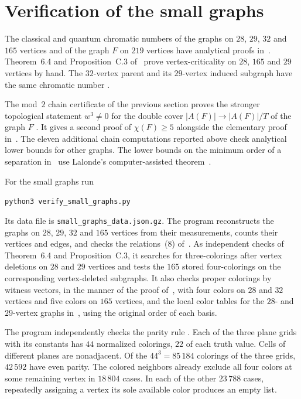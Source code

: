 \documentclass[11pt,a4paper]{article}
\begin{document}
\section{Verification of the small graphs}

The classical and quantum chromatic numbers of the graphs on $28$,
$29$, $32$ and $165$ vertices and of the graph $F$ on $219$ vertices have
analytical proofs in~\cite{Z}. Theorem~6.4 and Proposition~C.3 of~\cite{Z}
prove vertex-criticality on $28$, $165$ and $29$ vertices by hand. The
$32$-vertex parent and its $29$-vertex induced subgraph have the same
chromatic number \cite[Remark~C.4]{Z}.

The mod~$2$ chain certificate of the previous section proves the stronger
topological statement $w^3\ne0$ for the double cover
$|A(F)|\to |A(F)|/T$ of the graph $F$ \cite[Proposition~3.6]{Z}. It
gives a second proof of $\chi(F)\ge5$ alongside the elementary proof
in~\cite[Corollary~3.5]{Z}. The eleven additional chain computations
reported above check analytical lower bounds for other graphs. The lower
bounds on the minimum order of a separation in~\cite[Section~7]{Z} use
Lalonde's computer-assisted theorem~\cite{La}.

For the small graphs run
\begin{center}
  \texttt{python3 verify\_small\_graphs.py}
\end{center}
Its data file is \texttt{small\_graphs\_data.json.gz}. The program
reconstructs the graphs on $28$, $29$, $32$ and
$165$ vertices from their measurements, counts their vertices and edges,
and checks the relations~(8) of~\cite{Z}. As independent checks of
Theorem~6.4 and Proposition~C.3, it searches for three-colorings
after vertex deletions on $28$ and $29$ vertices and tests the $165$
stored four-colorings on the corresponding vertex-deleted subgraphs.
It also checks proper colorings by witness vectors, in the manner of the
proof of~\cite[Corollary~C.5]{Z}, with four colors on $28$ and
$32$ vertices and five colors on $165$ vertices, and the local
color tables for the $28$- and $29$-vertex graphs
in~\cite[Proposition~C.2]{Z}, using the original order of each basis.

The program independently checks the parity rule
\cite[Proposition~6.2]{Z}. Each of the three plane grids with its
constants has $44$ normalized colorings, $22$ of each truth value. Cells of
different planes are nonadjacent. Of the $44^3=85\,184$ colorings of the
three grids, $42\,592$ have even parity. The colored neighbors already
exclude all four colors at some remaining vertex in $18\,804$ cases. In
each of the other $23\,788$ cases, repeatedly assigning a vertex its sole
available color produces an empty list.
\end{document}
